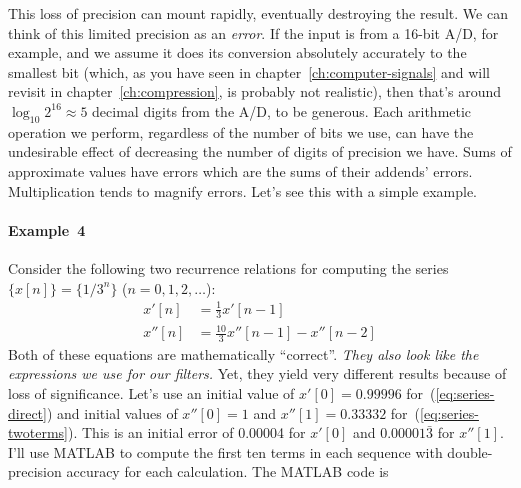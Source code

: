 This loss of precision can mount rapidly, eventually destroying the
result. We can think of this limited precision as an \emph{error}. If
the input is from a 16-bit A/D, for example, and we assume it does its
conversion absolutely accurately to the smallest bit (which, as you
have seen in chapter~\ref{ch:computer-signals} and will revisit in
chapter~\ref{ch:compression}, is probably not realistic), then that's
around $\log_{10} 2^{16} \approx 5$ decimal digits from the A/D, to be
generous. Each arithmetic operation we perform, regardless of the
number of bits we use, can have the undesirable effect of decreasing
the number of digits of precision we have.  Sums of approximate values
have errors which are the sums of their addends' errors.
Multiplication tends to magnify errors. Let's see this with a simple
example.

\paragraph{Example~4}
Consider the following two recurrence relations for computing the
series $\{x[n]\} = \{1/3^n\}$ ($n = 0, 1, 2, \ldots$):
\begin{align}
x'[n]  &= \frac{1}{3} x'[n-1] \label{eq:series-direct} \\
x''[n] &= \frac{10}{3} x''[n-1] - x''[n-2]
\label{eq:series-twoterms}
\end{align}
Both of these equations are mathematically ``correct''. \emph{They
also look like the expressions we use for our filters.}  Yet, they
yield very different results because of loss of significance.  Let's
use an initial value of $x'[0] = 0.99996$ for~(\ref{eq:series-direct})
and initial values of $x''[0]=1$ and $x''[1]=0.33332$
for~(\ref{eq:series-twoterms}). This is an initial error of 0.00004
for $x'[0]$ and $0.00001\bar{3}$ for $x''[1]$. I'll use MATLAB to
compute the first ten terms in each sequence with double-precision
accuracy for each calculation.  The MATLAB code is

